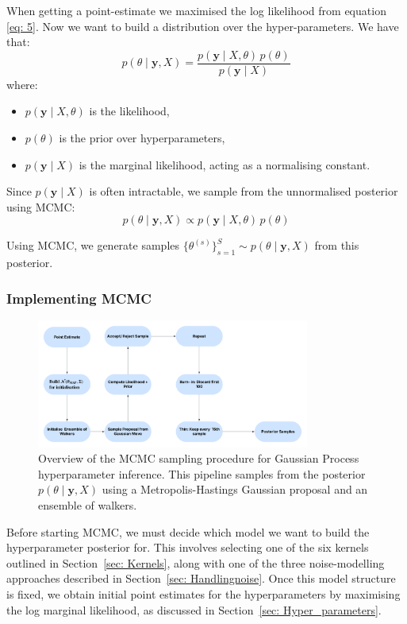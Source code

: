 \documentclass{article}
\begin{document}
\bigskip
\noindent
When getting a point-estimate we maximised the log likelihood from equation \ref{eq: 5}. Now we want to build a distribution over the hyper-parameters. We have that:
\[
p(\theta \mid \mathbf{y}, X) = \frac{p(\mathbf{y} \mid X, \theta) \, p(\theta)}{p(\mathbf{y} \mid X)}
\]
where:
\begin{itemize}
    \item \( p(\mathbf{y} \mid X, \theta) \) is the likelihood,
    \item \( p(\theta) \) is the prior over hyperparameters,
    \item \( p(\mathbf{y} \mid X) \) is the marginal likelihood, acting as a normalising constant.
\end{itemize}

\noindent
Since \( p(\mathbf{y} \mid X) \) is often intractable, we sample from the unnormalised posterior using MCMC:
\[
p(\theta \mid \mathbf{y}, X) \propto p(\mathbf{y} \mid X, \theta) \, p(\theta)
\]

\noindent
Using MCMC, we generate samples \( \{\theta^{(s)}\}_{s=1}^S \sim p(\theta \mid \mathbf{y}, X) \) from this posterior.


\subsubsection*{Implementing MCMC}
\begin{figure}[H]
    \centering
    \includegraphics[width=0.8\textwidth]{LatexPlots/MCMC_Flow.png}
    \caption{Overview of the MCMC sampling procedure for Gaussian Process hyperparameter inference.
     This pipeline samples from the posterior \( p(\theta \mid \mathbf{y}, X) \) using a Metropolis-Hastings Gaussian proposal and an ensemble of walkers.}
    \label{fig:MCMC flowchart}
\end{figure}

\noindent
Before starting MCMC, we must decide which model we want to build the hyperparameter posterior for. This involves selecting one of the six kernels outlined in Section~\ref{sec: Kernels}, along with one of the three noise-modelling approaches described in Section~\ref{sec: Handlingnoise}. Once this model structure is fixed, we obtain initial point estimates for the hyperparameters by maximising the log marginal likelihood, as discussed in Section~\ref{sec: Hyper_parameters}.
\end{document}
